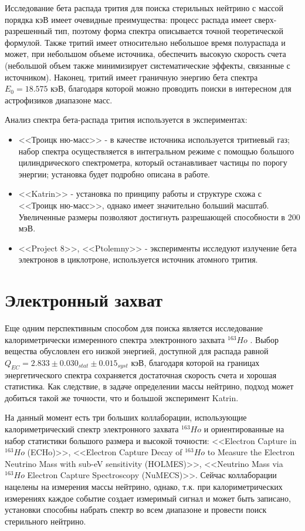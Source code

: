\documentclass[a4paper,14pt]{extreport}
\begin{document}
Исследование бета распада трития для поиска стерильных нейтрино с массой порядка кэВ имеет очевидные преимущества: процесс распада имеет сверх-разрешенный тип, поэтому форма спектра описывается точной теоретической формулой. Также тритий имеет относительно небольшое время полураспада и может, при небольшом объеме источника, обеспечить высокую скорость счета (небольшой объем также минимизирует систематические эффекты, связанные с источником). Наконец, тритий имеет граничную энергию бета спектра $ E_0 = 18.575 $ кэВ, благодаря которой можно проводить поиски в интересном для астрофизиков диапазоне масс.

Анализ спектра бета-распада трития используется в экспериментах:
\begin{itemize}
	\item <<Троицк ню-масс>> - в качестве источника используется тритиевый газ; набор спектра осуществляется в интегральном режиме с помощью большого цилиндрического спектрометра, который останавливает частицы по порогу энергии;  установка будет подробно описана в работе.
	\item <<Katrin>>\cite{katrin-design-report-2004}\cite{current-direct-neutrino-mass-experiments} - установка по принципу работы и структуре схожа с <<Троицк ню-масс>>, однако имеет значительно больший масштаб. Увеличенные размеры позволяют достигнуть разрешающей способности в 200 мэВ.
	\item <<Project 8>>\cite{rel-cyclotron-tritium}\cite{single-electron-detection-and-spectroscopy-via-relativistic-cyclotron-radiation}, <<Ptolemny>>\cite{ptolemy} - эксперименты исследуют излучение бета электронов в циклотроне, используется источник атомного трития.
\end{itemize}

\section{Электронный захват}
Еще одним перспективным способом для поиска является исследование калориметрически измеренного спектра электронного захвата  $ ^{163}Ho $ . Выбор вещества обусловлен его низкой энергией, доступной для распада равной $Q_{E C} = 2.833 \pm 0.030_{stat} \pm 0.015_{syst} $ кэВ\cite{1604.04210}\cite{0911.3329}, благодаря которой на границах энергетического спектра сохраняется достаточная скорость счета и хорошая статистика. Как следствие, в задаче определении массы нейтрино, подход может добиться такой же точности, что и большой эксперимент Katrin.

На данный момент есть три больших коллаборации, использующие калориметрический спектр электронного захвата  $ ^{163}Ho $ и ориентированные на набор статистики большого размера и высокой точности: <<Electron Capture in  $ ^{163}Ho $ (ECHo)>>\cite{1309.5214}, <<Electron Capture Decay of  $ ^{163}Ho $ to Measure the Electron Neutrino Mass with sub-eV sensitivity (HOLMES)>>\cite{1412.5060}, <<Neutrino Mass via  $ ^{163}Ho $ Electron Capture Spectroscopy (NuMECS)>>\cite{numex-position-paper}. Сейчас коллаборации нацелены на измерения массы нейтрино, однако, т.к. при калориметрических измерениях каждое событие создает измеримый сигнал и может быть записано, установки способны набрать спектр во всем диапазоне и провести поиск стерильного нейтрино.
\end{document}
